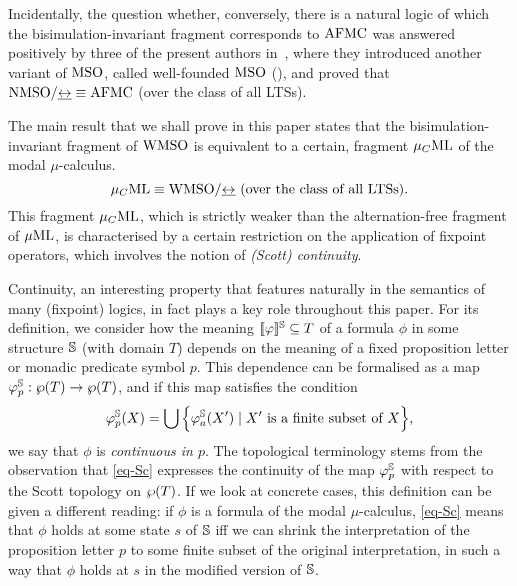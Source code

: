 Incidentally, the question whether, conversely, there is a natural logic of
which the
bisimulation-invariant fragment corresponds to $\mathrm{AFMC}$ was answered positively
by three of the present authors in~\cite{DBLP:conf/lics/FacchiniVZ13}, where they introduced
another variant of $\mathrm{MSO}$, called well-founded $\mathrm{MSO}$ (\nmso), and proved
that $\mathrm{NMSO}/{\mathrel{\underline{\leftrightarrow}}} \equiv \mathrm{AFMC}$ (over the class of all LTSs).

The main result that we shall prove in this paper states that the
bisimulation-invariant fragment of $\mathrm{WMSO}$ is equivalent to a certain,
fragment $\mu_{C}\mathrm{ML}$ of the modal $\mu$-calculus.
\begin{equation}
\label{eq-main}
\mucML \equiv \wmso/{\bis}  \text{ (over the class of all LTSs)}.
\end{equation}
This fragment $\mu_{C}\mathrm{ML}$, which is strictly weaker than the alternation-free fragment
of $\mu\mathrm{ML}$, is characterised by a certain restriction on the application of
fixpoint operators, which involves the notion of \emph{(Scott) continuity}.

Continuity, an interesting property that features naturally in the semantics
of many (fixpoint) logics, in fact plays a key role throughout this paper.
For its definition, we consider how the meaning $[\![\varphi]\!]^{\mathbb{S}} \subseteq T$
of a formula $\phi$ in some structure $\mathbb{S}$ (with domain $T$) depends on the meaning of a fixed
proposition letter or monadic predicate symbol $p$.
This dependence can be formalised as a map $\varphi^{\mathbb{S}}_{p}: \wp(T) \to
\wp (T)$, and if this map satisfies the condition
\begin{equation}
\label{eq-Sc}
\phi^{\model}_{p}(X) = \bigcup \Big\{ \phi^{\model}_{a}(X') \mid X'
\text{ is a finite subset of } X \Big\},
\end{equation}
we say that $\phi$ is \emph{continuous in $p$}.
The topological terminology stems from the observation that \eqref{eq-Sc}
expresses the continuity of the map $\varphi^{\mathbb{S}}_{p}$ with respect to the Scott
topology on $\wp(T)$. %
If we look at concrete cases, this definition can be given a different reading:
if $\phi$ is a formula of the
modal $\mu$-calculus, \eqref{eq-Sc} means that $\phi$ holds at some state $s$
of $\mathbb{S}$ iff we can shrink the interpretation of the proposition letter $p$
to some finite subset of the original interpretation, in such a way that
$\phi$ holds at $s$ in the modified version of $\mathbb{S}$.

